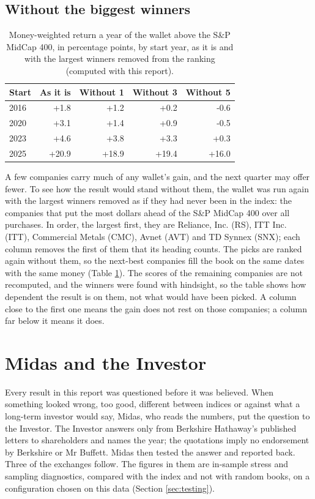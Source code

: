 \documentclass[11pt,a4paper]{article}
\begin{document}
\subsection{Without the biggest winners}
\begin{table}[H]
\centering
\small
\caption{Money-weighted return a year of the wallet above the S\&P MidCap 400, in percentage points, by start year, as it is and with the largest winners removed from the ranking (computed with this report).}\label{tab:winners}
\begin{tabular}{l r r r r}
\hline
Start & As it is & Without 1 & Without 3 & Without 5 \\
\hline
2016 & +1.8 & +1.2 & +0.2 & -0.6 \\
2020 & +3.1 & +1.4 & +0.9 & -0.5 \\
2023 & +4.6 & +3.8 & +3.3 & +0.3 \\
2025 & +20.9 & +18.9 & +19.4 & +16.0 \\
\hline
\end{tabular}
\end{table}
A few companies carry much of any wallet's gain, and the next quarter may offer fewer. To see how the result would stand without them, the wallet was run again with the largest winners removed as if they had never been in the index: the companies that put the most dollars ahead of the S\&P MidCap 400 over all purchases. In order, the largest first, they are Reliance, Inc. (RS), ITT Inc. (ITT), Commercial Metals (CMC), Avnet (AVT) and TD Synnex (SNX); each column removes the first of them that its heading counts. The picks are ranked again without them, so the next-best companies fill the book on the same dates with the same money (Table \ref{tab:winners}). The scores of the remaining companies are not recomputed, and the winners were found with hindsight, so the table shows how dependent the result is on them, not what would have been picked. A column close to the first one means the gain does not rest on those companies; a column far below it means it does.

\section{Midas and the Investor}
\label{sec:dialogue}
Every result in this report was questioned before it was believed. When something looked wrong, too good, different between indices or against what a long-term investor would say, Midas, who reads the numbers, put the question to the Investor. The Investor answers only from Berkshire Hathaway's published letters to shareholders and names the year; the quotations imply no endorsement by Berkshire or Mr Buffett. Midas then tested the answer and reported back. Three of the exchanges follow. The figures in them are in-sample stress and sampling diagnostics, compared with the index and not with random books, on a configuration chosen on this data (Section \ref{sec:testing}).
\end{document}
